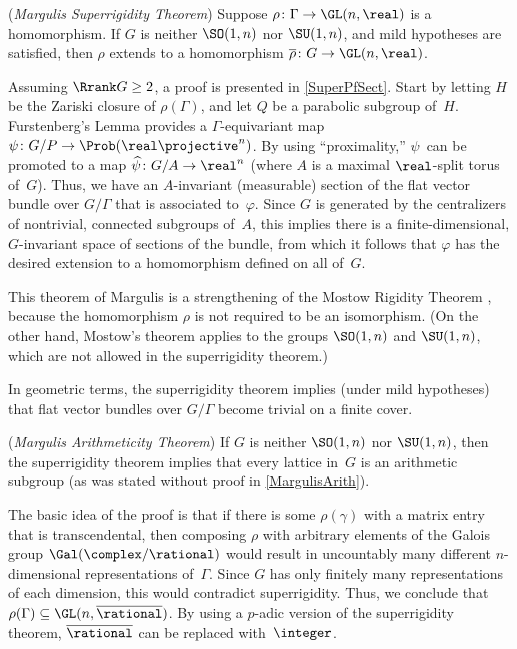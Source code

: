  (\emph{Margulis Superrigidity Theorem}) Suppose $\rho \colon \Gamma \to \GL(n,\real)$ is a homomorphism. If $G$ is neither $\SO(1,n)$ nor $\SU(1,n)$, and  mild hypotheses are satisfied, then $\rho$ extends to a homomorphism $\overline\rho \colon G \to \GL(n,\real)$. 

Assuming $\Rrank G \ge 2$, a proof is presented in \cref{SuperPfSect}. Start by letting $H$ be the Zariski closure of $\rho(\Gamma)$, and let $Q$ be a parabolic subgroup of~$H$. Furstenberg's Lemma  provides a $\Gamma$-equivariant map $\psi \colon G/P \to \Prob(\real \projective^n)$. By using ``proximality\zz,'' $\psi$~can be promoted to a map $\widehat\psi \colon G/A \to \real^n$ (where $A$ is a maximal $\real$-split torus of~$G$). Thus, we have an $A$-invariant (measurable) section of the flat vector bundle over $G/\Gamma$ that is associated to~$\varphi$. Since $G$ is generated by the centralizers of nontrivial, connected subgroups of~$A$, this implies there is a finite-dimensional, $G$-invariant space of sections of the bundle, from which it follows that $\varphi$ has the desired extension to a homomorphism defined on all of~$G$.

\smallbreak

 This theorem of Margulis is a strengthening of the Mostow Rigidity Theorem , because the homomorphism $\rho$ is not required to be an isomorphism.  (On the other hand, Mostow's theorem applies to the groups $\SO(1,n)$ and $\SU(1,n)$, which are not allowed in the superrigidity theorem.)

\smallbreak

 In geometric terms, the superrigidity theorem implies (under mild hypotheses) that flat vector bundles over $G/\Gamma$ become trivial on a finite cover.

\smallbreak

 (\emph{Margulis Arithmeticity Theorem}) If $G$ is neither $\SO(1,n)$ nor $\SU(1,n)$, then the superrigidity theorem implies that every lattice in~$G$ is an arithmetic subgroup (as was stated without proof in \cref{MargulisArith}). 

The basic idea of the proof is that if there is some $\rho(\gamma)$ with a matrix entry that is transcendental, then composing $\rho$ with arbitrary elements of the Galois group $\Gal(\complex/\rational)$ would result in uncountably many different $n$-dimensional representations of~$\Gamma$. Since $G$ has only finitely many representations of each dimension, this would contradict superrigidity. Thus, we conclude that $\rho(\Gamma) \subseteq \GL(n,\overline\rational)$. By using a $p$-adic version of the superrigidity theorem, $\overline\rational$ can be replaced with~$\integer$.

